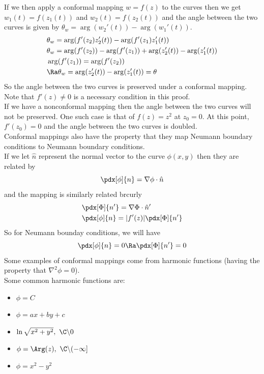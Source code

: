 If we then apply a conformal mapping $w=f(z)$ to the curves then we get $w_1(t)=f(z_1(t))$ and $w_2(t)=f(z_2(t))$ and the angle between the two curves is given by $\theta_w=\arg(w_2'(t))-\arg(w_1'(t))$.
\begin{align*}
    &\theta_{w}=\arg(f'(z_2)z_2'(t))-\arg(f'(z_1)z_1'(t))\\
    &\theta_{w}=\arg(f'(z_2))-\arg(f'(z_1))+\arg(z_2'(t))-\arg(z_1'(t))\\
    &\arg(f'(z_1))=\arg(f'(z_2))\\
    &\Ra \theta_w=\arg(z_2'(t))-\arg(z_1'(t))=\theta
\end{align*}
So the angle between the two curves is preserved under a conformal mapping.\\
Note that $f'(z)\neq0$ is a necessary condition in this proof.\\
If we have a nonconformal mapping then the angle between the two curves will not be preserved. One such case is that of $f(z)=z^2$ at $z_0=0$. At this point, $f'(z_0)=0$ and the angle between the two curves is doubled.\\

Conformal mappings also have the property that they map Neumann boundary conditions to Neumann boundary conditions.\\
If we let $\hat{n}$ represent the normal vector to the curve $\phi(x,y)$ then they are related by
\[\pdx[\phi]{n}=\nabla\phi\cdot\hat{n}\]
and the mapping is similarly related brcurly
\begin{align*}
    &\pdx[\Phi]{n'}=\nabla\Phi\cdot \hat{n}'\\
    &\pdx[\phi]{n}=|f'(z)|\pdx[\Phi]{n'}
\end{align*}
So for Neumann bounday conditions, we will have
\[\pdx[\phi]{n}=0\Ra\pdx[\Phi]{n'}=0\]
Some examples of conformal mappings come from harmonic functions (having the property that $\nabla^2\phi=0$).\\
Some common harmonic functions are:
\begin{itemize}
    \item $\phi=C$
    \item $\phi=ax+by+c$
    \item $\ln\sqrt{x^2+y^2},\ \C\backslash0$
    \item $\phi=\Arg(z),\ \C\backslash(-\infty]$
    \item $\phi=x^2-y^2$
\end{itemize}

